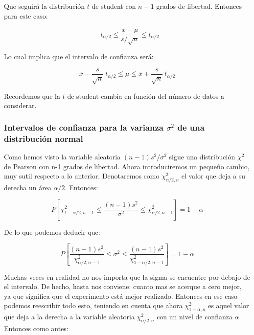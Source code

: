 \documentclass[12pt,a4paper]{book}
\begin{document}
Que seguirá la distribución $t$ de student con $n-1$ grados de libertad. Entonces para este caso:

\begin{equation}
- t_{\alpha/2} \leq  \dfrac{\bar{x}-\mu}{s / \sqrt{n}} \leq t_{\alpha/2}
\end{equation}

Lo cual implica que el intervalo de confianza será:

\begin{equation}
\bar{x} - \frac{s}{\sqrt{n}} \ t_{\alpha/2} \leq \mu \leq  \bar{x} +  \frac{s}{\sqrt{n}} \ t_{\alpha/2}
\end{equation}

Recordemos que la $t$ de student cambia en función del número de datos a considerar. 

\subsubsection{Intervalos de confianza para la varianza $ \sigma^2 $ de una distribución normal}

Como hemos visto la variable aleatoria $(n-1)s^2/\sigma^2$ sigue una distribución $\chi^2$ de Pearson con n-1 grados de libertad. Ahora introduciremos un pequeño cambio, muy sutil respecto a lo anterior. Denotaremos como $\chi^2_{\alpha/2,n}$ el valor que deja a su derecha un área $\alpha/2$. Entonces:

\begin{equation} 
P\left[ \chi^2_{1 - \alpha/2,n-1} \leq \dfrac{(n-1)s^2}{\sigma^2} \leq \chi^2_{ \alpha/2,n-1} \right] = 1 - \alpha
\end{equation}

De lo que podemos deducir que:

\begin{equation}
P \left[ \dfrac{(n-1)s^2}{\chi^2_{\alpha/2,n-1}} \leq \sigma^2 \leq \dfrac{(n-1)s^2}{\chi^2_{1 - \alpha/2,n-1}} \right] = 1 - \alpha
\end{equation}

Muchas veces en realidad no nos importa que la sigma se encuentre por debajo de el intervalo. De hecho, hasta nos conviene: cuanto mas se acerque a cero mejor, ya que significa que el experimento está mejor realizado. Entonces en ese caso podemos reescribir todo esto, teniendo en cuenta que ahora $\chi^2_{1-\alpha,n}$ es aquel valor que deja a la derecha a la variable aleatoria $\chi^2_{\alpha/2,n}$ con un nivel de confianza $\alpha$. Entonces como antes: 
\end{document}
